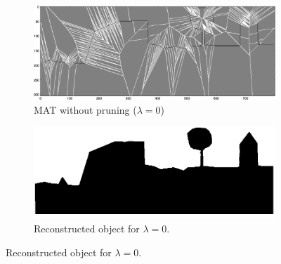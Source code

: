 \begin{figure}
	\centering
	\begin{subfigure}{0.4\linewidth}
		\includegraphics[width=\linewidth]{figs/rasterimpl/simple_dtm-gamma1_earthskel_.png}
		\caption{MAT without pruning ($\lambda=0$)}
		\label{fig:imaimp:a}
	\end{subfigure}
	\quad
	\begin{subfigure}{0.4\linewidth}
		\includegraphics[width=\linewidth]{figs/rasterimpl/simple_dtm-gamma1_earthskel.png}
		\caption{Reconstructed object for $\lambda=0$.}
		\label{fig:imaimp:b}
	\end{subfigure}
	

\end{figure}

